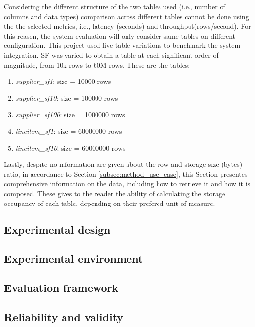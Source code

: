 Considering the different structure of the two tables used (i.e., number of columns and data types) comparison across different tables cannot be done using the the selected metrics, i.e., latency (seconds) and throughput(rows/second). For this reason, the system evaluation will only consider same tables on different configuration. This project used five table variations to benchmark the system integration. \gls{SF} was varied to obtain a table at each significant order of magnitude, from 10k rows to 60M rows. These are the tables:
\begin{enumerate}
    \item \textit{supplier\_sf1}: size = 10000 rows
    \item \textit{supplier\_sf10}: size = 100000 rows
    \item \textit{supplier\_sf100}: size = 1000000 rows
    \item \textit{lineitem\_sf1}: size = 60000000 rows
    \item \textit{lineitem\_sf10}: size = 60000000 rows
\end{enumerate}

Lastly, despite no information are given about the row and storage size (bytes) ratio, in accordance to Section \ref{subsec:method_use_case}, this Section presentes comprehensive information on the data, including how to retrieve it and how it is composed. These gives to the reader the ability of calculating the storage occupancy of each table, depending on their prefered unit of measure.



\subsection{Experimental design}
\label{subsec:experimental_design}



\subsection{Experimental environment}
\label{subsec:experimental_env}



\subsection{Evaluation framework}
\label{subsec:method_eval_framework}


\subsection{Reliability and validity}
\label{subsec:method_reliability_validity}